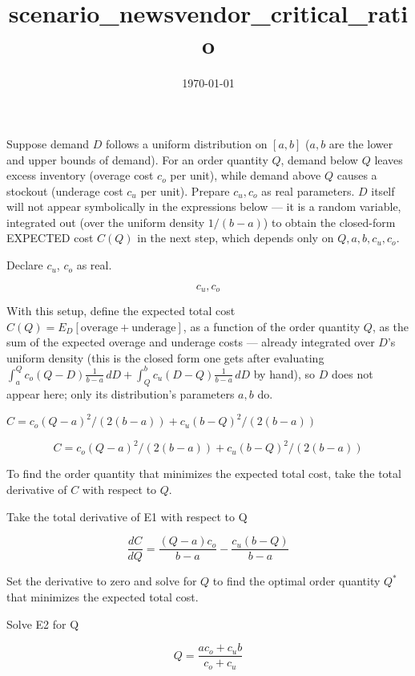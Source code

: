 \documentclass[dvipdfmx]{article}
\title{scenario\_newsvendor\_critical\_ratio}
\date{\today}
\begin{document}
\maketitle

Suppose demand $D$ follows a uniform distribution on $[a,b]$ ($a,b$ are the lower and upper bounds of demand). For an order quantity $Q$, demand below $Q$ leaves excess inventory (overage cost $c_o$ per unit), while demand above $Q$ causes a stockout (underage cost $c_u$ per unit). Prepare $c_u,c_o$ as real parameters. $D$ itself will not appear symbolically in the expressions below — it is a random variable, integrated out (over the uniform density $1/(b-a)$) to obtain the closed-form EXPECTED cost $C(Q)$ in the next step, which depends only on $Q,a,b,c_u,c_o$.

Declare $c_u$, $c_o$ as real.

\[
  c_u, c_o
\]

With this setup, define the expected total cost $C(Q)=E_D[\text{overage}+\text{underage}]$, as a function of the order quantity $Q$, as the sum of the expected overage and underage costs — already integrated over $D$'s uniform density (this is the closed form one gets after evaluating $\int_a^Q c_o(Q-D)\frac1{b-a}\,dD+\int_Q^b c_u(D-Q)\frac1{b-a}\,dD$ by hand), so $D$ does not appear here; only its distribution's parameters $a,b$ do.

$C = c_o (Q - a)^2 / (2 (b - a)) + c_u (b - Q)^2 / (2 (b - a))$

\begin{equation}
  C = c_o (Q - a)^2 / (2 (b - a)) + c_u (b - Q)^2 / (2 (b - a))
  \label{eq:E1}
\end{equation}

To find the order quantity that minimizes the expected total cost, take the total derivative of $C$ with respect to $Q$.

Take the total derivative of E1 with respect to Q

\begin{equation}
  \frac{dC}{dQ} = \frac{\left(Q-a\right) c_{o}}{b-a}-\frac{c_{u} \left(b-Q\right)}{b-a}
  \label{eq:E2}
\end{equation}

Set the derivative to zero and solve for $Q$ to find the optimal order quantity $Q^*$ that minimizes the expected total cost.

Solve E2 for Q

\begin{equation}
  Q = \frac{a c_{o}+c_{u} b}{c_{o}+c_{u}}
  \label{eq:E3}
\end{equation}
\end{document}

